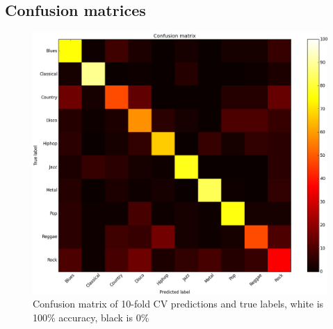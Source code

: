 \subsection{Confusion matrices}
\begin{figure}
	\includegraphics[width=\textwidth]{confusion_matrix.png}
	\caption{Confusion matrix of 10-fold CV predictions and true labels, white is 100\% accuracy, black is 0\%}
\end{figure}
\blindtext
